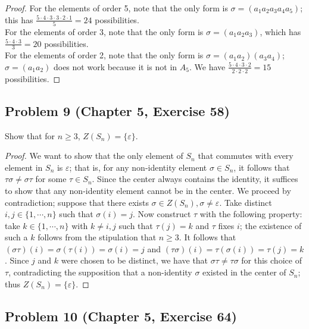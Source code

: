 \documentclass{article}
\begin{document}
\begin{proof}
For the elements of order 5, note that the only form is $\sigma = (a_1a_2a_3a_4a_5)$; this has $\frac{5\cdot4\cdot3\cdot3\cdot2\cdot1}{5} = 24$ possibilities. \\
For the elements of order 3, note that the only form is $\sigma = (a_1a_2a_3)$, which has $\frac{5\cdot4\cdot3}{3} = 20$ possibilities. \\
For the elements of order 2, note that the only form is $\sigma = (a_1a_2)(a_3a_4)$; $\sigma = (a_1a_2)$ does not work because it is not in $A_5$. We have $\frac{5\cdot4\cdot3\cdot2}{2\cdot2\cdot2} = 15$ possibilities.
\end{proof}

\subsection*{Problem 9 (Chapter 5, Exercise 58)}

Show that for $n \geq 3$, $Z(S_n) = \{\varepsilon\}$.

\begin{proof}
We want to show that the only element of $S_n$ that commutes with every element in $S_n$ is $\varepsilon$; that is, for any non-identity element $\sigma \in S_n$, it follows that $\tau\sigma \neq \sigma\tau$ for some $\tau \in S_n$. Since the center always contains the identity, it suffices to show that any non-identity element cannot be in the center. We proceed by contradiction; suppose that there exists $\sigma \in Z(S_n), \sigma \neq \varepsilon$. Take distinct $i, j \in \{1,\cdots,n\}$ such that $\sigma(i) = j$. Now construct $\tau$ with the following property: take $k \in \{1,\cdots,n\}$ with $k \neq i, j$ such that $\tau(j) = k$ and $\tau$ fixes $i$; the existence of such a $k$ follows from the stipulation that $n \geq 3$. It follows that $(\sigma\tau)(i) = \sigma(\tau(i)) = \sigma(i) = j$ and $(\tau\sigma)(i) = \tau(\sigma(i)) = \tau(j) = k$. Since $j$ and $k$ were chosen to be distinct, we have that $\sigma\tau \neq \tau\sigma$ for this choice of $\tau$, contradicting the supposition that a non-identity $\sigma$ existed in the center of $S_n$; thus $Z(S_n) = \{\varepsilon\}$.

\end{proof}

\subsection*{Problem 10 (Chapter 5, Exercise 64)}
\end{document}
